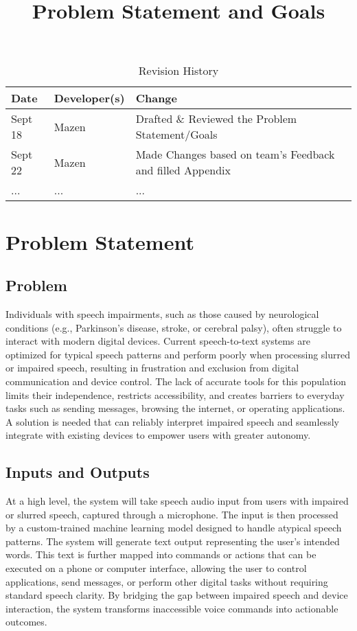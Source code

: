 \documentclass{article}
\title{Problem Statement and Goals\\\progname}
\author{\authname}
\date{}
\begin{document}
\maketitle

\begin{table}[hp]
\caption{Revision History} \label{TblRevisionHistory}
\begin{tabularx}{\textwidth}{llX}
\toprule
\textbf{Date} & \textbf{Developer(s)} & \textbf{Change}\\
\midrule
Sept 18 & Mazen & Drafted \& Reviewed the Problem Statement/Goals\\
Sept 22 & Mazen & Made Changes based on team's Feedback and filled Appendix\\
... & ... & ...\\
\bottomrule
\end{tabularx}
\end{table}

\section{Problem Statement}

\subsection{Problem}
Individuals with speech impairments, such as those caused by neurological conditions (e.g., Parkinson's disease, stroke, or cerebral palsy), often struggle to interact with modern digital devices. Current speech-to-text systems are optimized for typical speech patterns and perform poorly when processing slurred or impaired speech, resulting in frustration and exclusion from digital communication and device control. The lack of accurate tools for this population limits their independence, restricts accessibility, and creates barriers to everyday tasks such as sending messages, browsing the internet, or operating applications. A solution is needed that can reliably interpret impaired speech and seamlessly integrate with existing devices to empower users with greater autonomy.

\subsection{Inputs and Outputs}
At a high level, the system will take speech audio input from users with impaired or slurred speech, captured through a microphone. The input is then processed by a custom-trained machine learning model designed to handle atypical speech patterns. The system will generate text output representing the user's intended words. This text is further mapped into commands or actions that can be executed on a phone or computer interface, allowing the user to control applications, send messages, or perform other digital tasks without requiring standard speech clarity. By bridging the gap between impaired speech and device interaction, the system transforms inaccessible voice commands into actionable outcomes.
\end{document}
